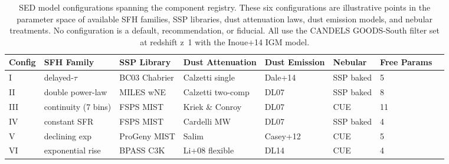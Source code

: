 \begin{table}
\centering
\caption{%
SED model configurations spanning the component registry. These six configurations
are illustrative points in the parameter space of available SFH families, SSP libraries,
dust attenuation laws, dust emission models, and nebular treatments. No configuration is
a default, recommendation, or fiducial. All use the CANDELS GOODS-South filter set at
redshift z~1 with the Inoue+14 IGM model.
}
\label{tab:configs}
\begin{tabular}{llllllll}
\hline
Config & SFH Family & SSP Library & Dust Attenuation & Dust Emission & Nebular & Free Params \\
\hline
I & delayed-$\tau$ & BC03 Chabrier & Calzetti single & Dale+14 & SSP baked & 5 \\
II & double power-law & MILES wNE & Calzetti two-comp & DL07 & SSP baked & 8 \\
III & continuity (7 bins) & FSPS MIST & Kriek \& Conroy & DL07 & CUE & 11 \\
IV & constant SFR & FSPS MIST & Cardelli MW & DL07 & SSP baked & 4 \\
V & declining exp & ProGeny MIST & Salim & Casey+12 & CUE & 5 \\
VI & exponential rise & BPASS C3K & Li+08 flexible & DL14 & CUE & 4 \\
\hline
\end{tabular}
\end{table}
